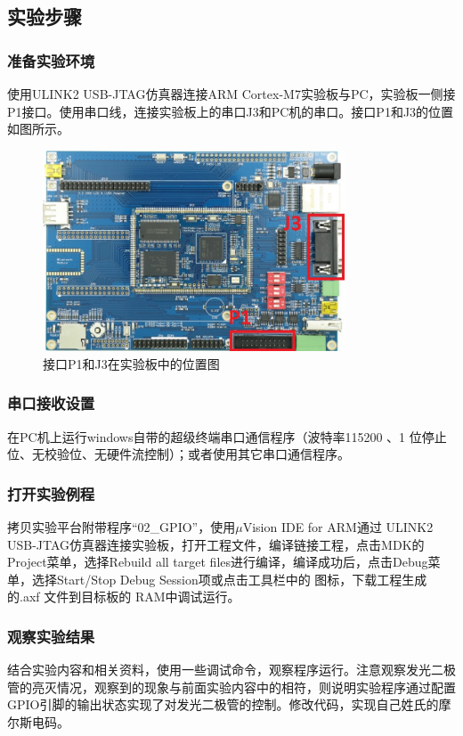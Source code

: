 ﻿\documentclass[UTF8,12pt]{article}
\begin{document}
\subsection{实验步骤}
\subsubsection{准备实验环境}
使用ULINK2 USB-JTAG仿真器连接ARM Cortex-M7实验板与PC，实验板一侧接P1接口。使用串口线，连接实验板上的串口J3和PC机的串口。接口P1和J3的位置如图所示。

\begin{figure}[htbp]
    \centering
    \includegraphics[width=0.8\textwidth]{imgs/2.png}
    \caption{接口P1和J3在实验板中的位置图}
\end{figure}

\subsubsection{串口接收设置}
在PC机上运行windows自带的超级终端串口通信程序（波特率115200 、1 位停止位、无校验位、无硬件流控制）；或者使用其它串口通信程序。 

\subsubsection{打开实验例程}
拷贝实验平台附带程序“02\_GPIO”，使用$\mu$Vision IDE for ARM通过 ULINK2 USB-JTAG仿真器连接实验板，打开工程文件，编译链接工程，点击MDK的Project菜单，选择Rebuild all target files进行编译，编译成功后，点击Debug菜单，选择Start/Stop Debug Session项或点击工具栏中的 图标，下载工程生成的.axf 文件到目标板的 RAM中调试运行。

\subsubsection{观察实验结果}
结合实验内容和相关资料，使用一些调试命令，观察程序运行。注意观察发光二极管的亮灭情况，观察到的现象与前面实验内容中的相符，则说明实验程序通过配置GPIO引脚的输出状态实现了对发光二极管的控制。修改代码，实现自己姓氏的摩尔斯电码。
\end{document}
